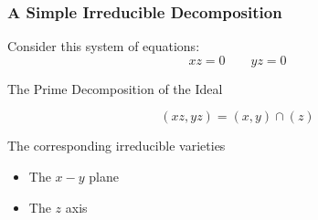 \documentclass{beamer}
\begin{document}
\begin{frame}
\frametitle{A Simple Irreducible Decomposition}

Consider this system of equations:
\[ xz = 0 \qquad yz = 0 \]

The Prime Decomposition of the Ideal

\[ (xz,yz) = (x,y) \cap (z) \]

The corresponding irreducible varieties

\begin{itemize}
\item The $x-y$ plane
\item The $z$ axis
\end{itemize}

\begin{center}

\end{center}
\end{frame}
\end{document}
